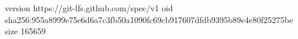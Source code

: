 version https://git-lfs.github.com/spec/v1
oid sha256:955a8999e75e6d6a7c3fb50a1090fc69cb917607dfdb9395b89e4e80f25275be
size 165659
